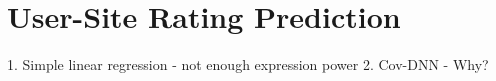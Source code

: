\section{User-Site Rating Prediction}
\label{sec:prediction}

1. Simple linear regression - not enough expression power
2. Cov-DNN - Why?
